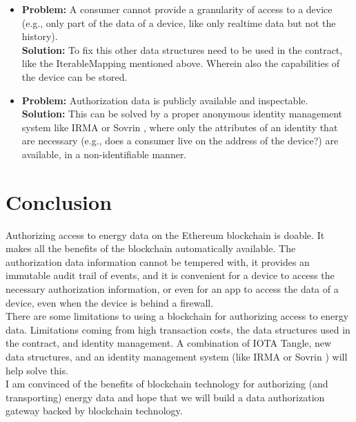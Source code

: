 \documentclass[paper=a4, fontsize=11pt]{scrartcl}
\numberwithin{equation}{section} %
\numberwithin{figure}{section}   %
\numberwithin{table}{section}    %
\begin{document}
\begin{itemize}
\item \textbf{Problem:} A consumer cannot provide a granularity of access to a
  device (e.g., only part of the data of a device, like only realtime data but
  not the history). \\\textbf{Solution:} To fix this other data structures need
  to be used in the contract, like the IterableMapping mentioned above. Wherein
  also the capabilities of the device can be stored.
\item \textbf{Problem:} Authorization data is publicly available and
  inspectable. \\\textbf{Solution:} This can be solved by a proper anonymous
  identity management system like IRMA \cite{irma} or Sovrin \cite{sovrin},
  where only the attributes of an identity that are necessary (e.g., does a
  consumer live on the address of the device?) are available, in a
  non-identifiable manner.
\end{itemize}

\section{Conclusion}

Authorizing access to energy data on the Ethereum blockchain is doable. It makes
all the benefits of the blockchain automatically available. The authorization
data information cannot be tempered with, it provides an immutable audit trail
of events, and it is convenient for a device to access the necessary
authorization information, or even for an app to access the data of a device,
even when the device is behind a firewall.\\

There are some limitations to using a blockchain for authorizing access to
energy data. Limitations coming from high transaction costs, the data structures
used in the contract, and identity management. A combination of IOTA Tangle, new
data structures, and an identity management system (like IRMA \cite{irma} or
Sovrin \cite{sovrin}) will help solve this.\\

I am convinced of the benefits of blockchain technology for authorizing (and
transporting) energy data and hope that we will build a data authorization
gateway backed by blockchain technology. \\



\end{document}
